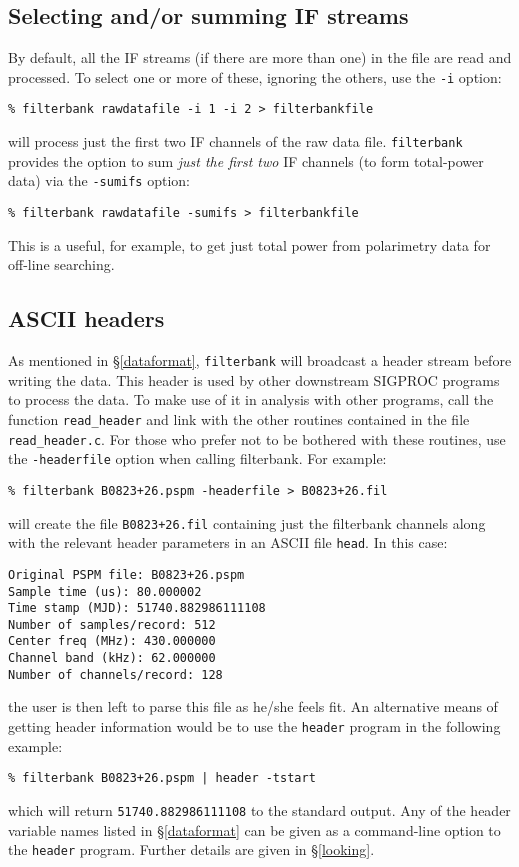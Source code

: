 \documentclass[11pt]{article}
\begin{document}
\subsection*{Selecting and/or summing IF streams}
By default, all the IF streams (if there are more than one) in the
file are read and processed. To select one or more of these, ignoring
the others, use the {\tt -i} option:
\begin{verbatim}
% filterbank rawdatafile -i 1 -i 2 > filterbankfile
\end{verbatim}
will process just the first two IF channels of the raw data file.
{\tt filterbank} provides the option to sum {\sl just the first two} IF
channels (to form total-power data) via the {\tt -sumifs} option:
\begin{verbatim}
% filterbank rawdatafile -sumifs > filterbankfile
\end{verbatim}
This is a useful, for example, to get just total power from
polarimetry data for off-line searching.

\subsection*{ASCII headers}
As mentioned in \S \ref{dataformat}, {\tt filterbank} will broadcast a
header stream before writing the data. This header is used by other
downstream SIGPROC programs to process the data. To make use of it in
analysis with other programs, call the function \verb+read_header+ and
link with the other routines contained in the file
\verb+read_header.c+.  For those who prefer not to be bothered with
these routines, use the {\tt -headerfile} option when calling
filterbank. For example:
\begin{verbatim}
% filterbank B0823+26.pspm -headerfile > B0823+26.fil
\end{verbatim}
will create the file {\tt B0823+26.fil} containing just the filterbank
channels along with the relevant header parameters in an ASCII file
{\tt head}. In this case:
\begin{verbatim}
Original PSPM file: B0823+26.pspm
Sample time (us): 80.000002
Time stamp (MJD): 51740.882986111108
Number of samples/record: 512
Center freq (MHz): 430.000000
Channel band (kHz): 62.000000
Number of channels/record: 128
\end{verbatim}
the user is then left to parse this file as he/she feels fit.
An alternative means of getting header information would be
to use the {\tt header} program in the following example:
\begin{verbatim}
% filterbank B0823+26.pspm | header -tstart
\end{verbatim}
which will return {\tt 51740.882986111108} to the standard output.
Any of the header variable names listed in \S \ref{dataformat}
can be given as a command-line option to the {\tt header} program.
Further details are given in \S \ref{looking}.
\end{document}
